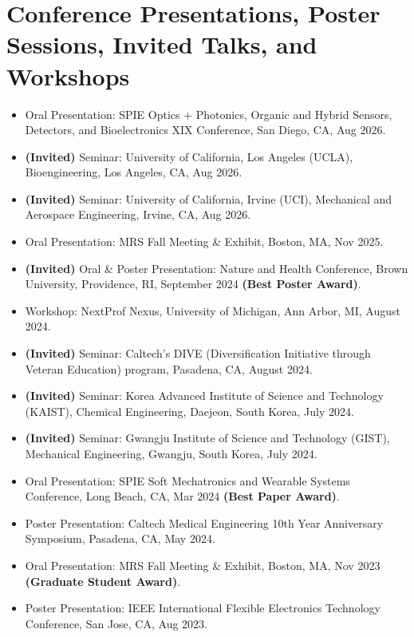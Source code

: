 \documentclass[11pt,a4paper]{article}
\begin{document}
\section{Conference Presentations, Poster Sessions, Invited Talks, and Workshops}
\begin{itemize}[leftmargin=*, itemsep=2pt, parsep=0pt, topsep=2pt]
  \item Oral Presentation: SPIE Optics + Photonics, Organic and Hybrid Sensors, Detectors, and Bioelectronics XIX Conference, San Diego, CA, Aug 2026.
  \item \textbf{(Invited)} Seminar: University of California, Los Angeles (UCLA), Bioengineering, Los Angeles, CA, Aug 2026.
  \item \textbf{(Invited)} Seminar: University of California, Irvine (UCI), Mechanical and Aerospace Engineering, Irvine, CA, Aug 2026.
  \item Oral Presentation: MRS Fall Meeting \& Exhibit, Boston, MA, Nov 2025.
  \item \textbf{(Invited)} Oral \& Poster Presentation: Nature and Health Conference, Brown University, Providence, RI, September 2024 \textbf{(Best Poster Award)}.
  \item Workshop: NextProf Nexus, University of Michigan, Ann Arbor, MI, August 2024.
  \item \textbf{(Invited)} Seminar: Caltech's DIVE (Diversification Initiative through Veteran Education) program, Pasadena, CA, August 2024.
  \item \textbf{(Invited)} Seminar: Korea Advanced Institute of Science and Technology (KAIST), Chemical Engineering, Daejeon, South Korea, July 2024.
  \item \textbf{(Invited)} Seminar: Gwangju Institute of Science and Technology (GIST), Mechanical Engineering, Gwangju, South Korea, July 2024.
  \item Oral Presentation: SPIE Soft Mechatronics and Wearable Systems Conference, Long Beach, CA, Mar 2024 \textbf{(Best Paper Award)}.
  \item Poster Presentation: Caltech Medical Engineering 10th Year Anniversary Symposium, Pasadena, CA, May 2024.
  \item Oral Presentation: MRS Fall Meeting \& Exhibit, Boston, MA, Nov 2023 \textbf{(Graduate Student Award)}.
  \item Poster Presentation: IEEE International Flexible Electronics Technology Conference, San Jose, CA, Aug 2023.
\end{itemize}
\end{document}
